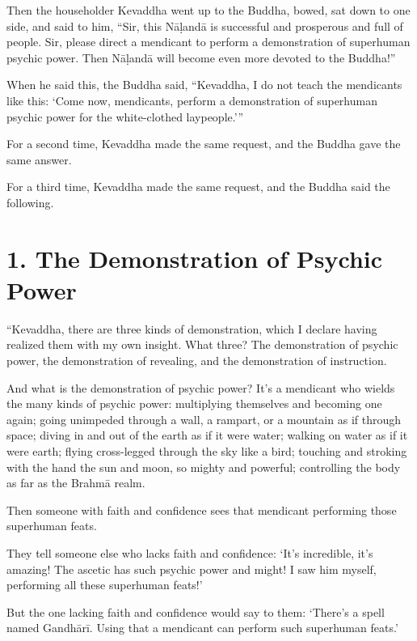 \documentclass[12pt,openany]{book}%
\begin{document}
Then the householder Kevaddha went up to the Buddha, bowed, sat down to one side, and said to him, “Sir, this \textsanskrit{Nāḷandā} is successful and prosperous and full of people. Sir, please direct a mendicant to perform a demonstration of superhuman psychic power. Then \textsanskrit{Nāḷandā} will become even more devoted to the Buddha!” 

When he said this, the Buddha said, “Kevaddha, I do not teach the mendicants like this: ‘Come now, mendicants, perform a demonstration of superhuman psychic power for the white-clothed laypeople.’” 

For a second time, Kevaddha made the same request, and the Buddha gave the same answer. 

For a third time, Kevaddha made the same request, and the Buddha said the following. 

\section*{1. The Demonstration of Psychic Power }

“Kevaddha, there are three kinds of demonstration, which I declare having realized them with my own insight. What three? The demonstration of psychic power, the demonstration of revealing, and the demonstration of instruction. 

And what is the demonstration of psychic power? It’s a mendicant who wields the many kinds of psychic power: multiplying themselves and becoming one again; going unimpeded through a wall, a rampart, or a mountain as if through space; diving in and out of the earth as if it were water; walking on water as if it were earth; flying cross-legged through the sky like a bird; touching and stroking with the hand the sun and moon, so mighty and powerful; controlling the body as far as the \textsanskrit{Brahmā} realm. 

Then someone with faith and confidence sees that mendicant performing those superhuman feats. 

They tell someone else who lacks faith and confidence: ‘It’s incredible, it’s amazing! The ascetic has such psychic power and might! I saw him myself, performing all these superhuman feats!’ 

But the one lacking faith and confidence would say to them: ‘There’s a spell named \textsanskrit{Gandhārī}. Using that a mendicant can perform such superhuman feats.’ 
\end{document}

